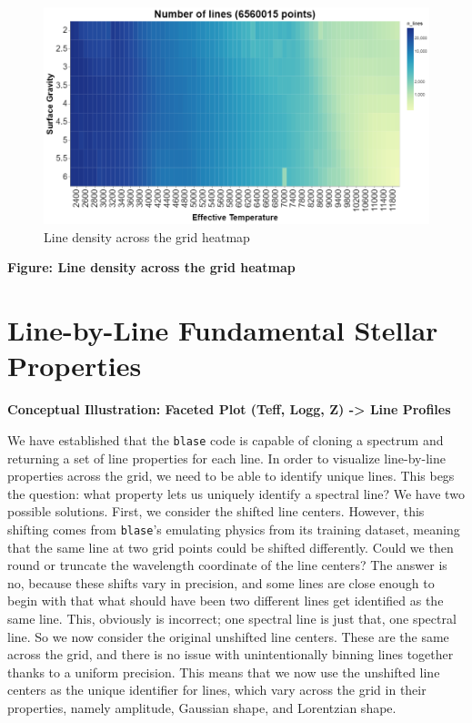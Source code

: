 \documentclass[twocolumn]{aastex631}
\begin{document}
\begin{figure}
    \includegraphics[width=\textwidth]{images/line_density.png}
    \caption{Line density across the grid heatmap}
\end{figure}


\begin{mdframed}
    \textbf{Figure: Line density across the grid heatmap}
\end{mdframed}


\section{Line-by-Line Fundamental Stellar Properties}
\begin{mdframed}
    \textbf{Conceptual Illustration: Faceted Plot (Teff, Logg, Z) -> Line Profiles}
\end{mdframed}

We have established that the \texttt{blase} code is capable of cloning a spectrum and
returning a set of line properties for each line. In order to visualize line-by-line
properties across the grid, we need to be able to identify unique lines. This begs the question:
what property lets us uniquely identify a spectral line? We have two possible solutions.
First, we consider the shifted line centers. However, this shifting comes from \texttt{blase}'s
emulating physics from its training dataset, meaning that the same line at two grid points could
be shifted differently. Could we then round or truncate the wavelength coordinate of the line centers?
The answer is no, because these shifts vary in precision, and some lines are close enough to begin with
that what should have been two different lines get identified as the same line. This, obviously is incorrect;
one spectral line is just that, one spectral line. So we now consider the original unshifted line centers.
These are the same across the grid, and there is no issue with unintentionally binning lines together
thanks to a uniform precision. This means that we now use the unshifted line centers as the unique
identifier for lines, which vary across the grid in their properties, namely amplitude, Gaussian shape,
and Lorentzian shape.
\end{document}
